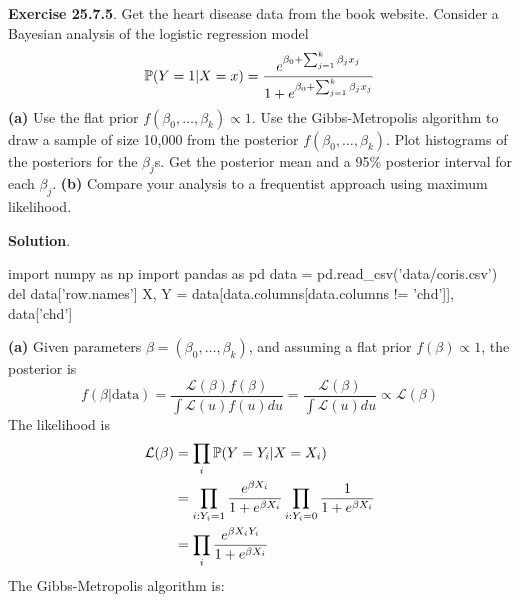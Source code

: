 \textbf{Exercise 25.7.5}. Get the heart disease data from the book
website. Consider a Bayesian analysis of the logistic regression model
\[
\operatorname{\mathbb{P}}(Y = 1 | X = x) = \frac{e^{ \beta_{0} + \sum_{j=1}^{k} \beta_{j} x_{j} } }{1 + e^{ \beta_{0} + \sum_{j=1}^{k} \beta_{j} x_{j} }}
\]
\textbf{(a)} Use the flat prior
\(f(\beta_{0}, \dots, \beta_{k}) \propto 1\). Use the Gibbs-Metropolis
algorithm to draw a sample of size 10,000 from the posterior
\(f(\beta_{0}, \dots, \beta_{k})\). Plot histograms of the posteriors for
the \(\beta_{j}\)s. Get the posterior mean and a 95\% posterior interval
for each \(\beta_{j}\).
\textbf{(b)} Compare your analysis to a frequentist approach using
maximum likelihood.

\textbf{Solution}.

\begin{python}
import numpy as np
import pandas as pd
data = pd.read_csv('data/coris.csv')
del data['row.names']
X, Y = data[data.columns[data.columns != 'chd']], data['chd']
\end{python}
\textbf{(a)} Given parameters \(\beta = (\beta_{0}, \dots, \beta_{k})\), and
assuming a flat prior \(f(\beta) \propto 1\), the posterior is
\[
f(\beta | \text{data}) = \frac{\mathcal{L}(\beta) f(\beta)}{\int \mathcal{L}(u) f(u) du} = \frac{\mathcal{L}(\beta)}{\int \mathcal{L}(u) du} \propto \mathcal{L}(\beta)
\]
The likelihood is
\begin{align*}
\mathcal{L}(\beta) &= \prod_{i} \operatorname{\mathbb{P}}(Y = Y_{i} | X = X_{i})  \\
&= \prod_{i: Y_{i} = 1} \frac{e^{ \beta X_{i} } }{1 + e^{ \beta X_{i} }} \prod_{i: Y_{i} = 0} \frac{1}{1 + e^{ \beta X_{i} }} \\
&= \prod_{i} \frac{e^{ \beta X_{i} Y_{i} } }{1 + e^{ \beta X_{i} }}
\end{align*}
The Gibbs-Metropolis algorithm is:
